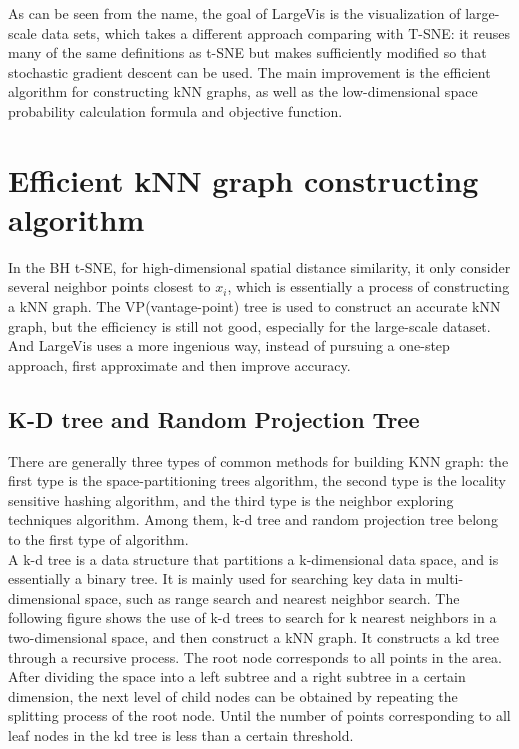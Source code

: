 \noindent As can be seen from the name, the goal of LargeVis\cite{ref5} is the visualization of large-scale data sets, which takes a different approach comparing with T-SNE: it reuses many of the same definitions as t-SNE but makes sufficiently modified so that stochastic gradient descent can be used. The main improvement is the efficient algorithm for constructing kNN graphs, as well as the low-dimensional space probability calculation formula and objective function.

\section{Efficient kNN graph constructing algorithm}

In the BH t-SNE, for high-dimensional spatial distance similarity, it only consider several neighbor points closest to $x_i$, which is essentially a process of constructing a kNN graph. The VP(vantage-point) tree is used to construct an accurate kNN graph, but the efficiency is still not good, especially for the large-scale dataset. And LargeVis uses a more ingenious way, instead of pursuing a one-step approach, first approximate and then improve accuracy.\\

\subsection{K-D tree and Random Projection Tree}

There are generally three types of common methods for building KNN graph: the first type is the space-partitioning trees algorithm, the second type is the locality sensitive hashing algorithm, and the third type is the neighbor exploring techniques algorithm. Among them, k-d tree and random projection tree belong to the first type of algorithm.\\

\noindent A k-d tree is a data structure that partitions a k-dimensional data space, and is essentially a binary tree. It is mainly used for searching key data in multi-dimensional space, such as range search and nearest neighbor search. The following figure shows the use of k-d trees to search for k nearest neighbors in a two-dimensional space, and then construct a kNN graph. It constructs a kd tree through a recursive process. The root node corresponds to all points in the area. After dividing the space into a left subtree and a right subtree in a certain dimension, the next level of child nodes can be obtained by repeating the splitting process of the root node. Until the number of points corresponding to all leaf nodes in the kd tree is less than a certain threshold.\\

